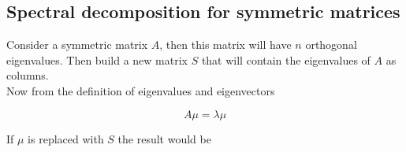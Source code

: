 \documentclass[12pt,journal]{IEEEtran}
\begin{document}
    \subsection{Spectral decomposition for symmetric matrices} \label{spectral_decomp}

    Consider a symmetric matrix $A$, then this matrix will have $n$ orthogonal
    eigenvalues. Then build a new matrix $S$ that will contain the eigenvalues of
    $A$ as columns.\\

    Now from the definition of eigenvalues and eigenvectors

    \begin{equation*}
        A \mu = \lambda \mu
    \end{equation*}

    If $\mu$ is replaced with $S$ the result would be
\end{document}
